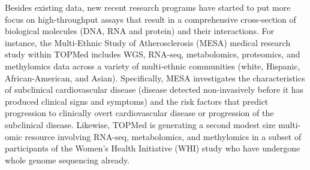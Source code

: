 \documentclass[letter]{bioinfo}
\begin{document}
	
	Besides existing data, new recent research programs have started to put more focus on high-throughput assays that result in a comprehensive cross-section of biological molecules (DNA, RNA and protein) and their interactions. For instance, the Multi-Ethnic Study of Atherosclerosis (MESA) medical research study \citep{Bild:2002:MultiEthnic} within TOPMed includes WGS, RNA-seq, metabolomics, proteomics, and methylomics data across a variety of multi-ethnic communities (white, Hispanic, African-American, and Asian).  Specifically, MESA investigates the characteristics of subclinical cardiovascular disease (disease detected non-invasively before it has produced clinical signs and symptoms) and the risk factors that predict progression to clinically overt cardiovascular disease or progression of the subclinical disease.  Likewise, TOPMed is generating a second modest size multi-omic resource involving RNA-seq, metabolomics, and methylomics in a subset of participants of the Women's Health Initiative (WHI) study \citep{NHLBI:1991:Women} who have undergone whole genome sequencing already.  
\end{document}
